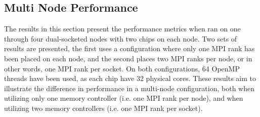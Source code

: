 \subsection{Multi Node Performance}
The results in this section present the performance metrics when ran on one through four dual-socketed nodes with two  chips on each node. Two sets of results are presented, the first uses a configuration where only one MPI rank has been placed on each node, and the second places two MPI ranks per node, or in other words, one MPI rank per socket. On both configurations, 64 OpenMP threads have been used, as each chip have 32 physical cores. These results aim to illustrate the difference in performance in a multi-node configuration, both when utilizing only one memory controller (i.e. one MPI rank per node), and when utilizing two memory controllers (i.e. one MPI rank per socket). 
\medskip



\section{\romeq{}}


\section{\fpgaq{}}

